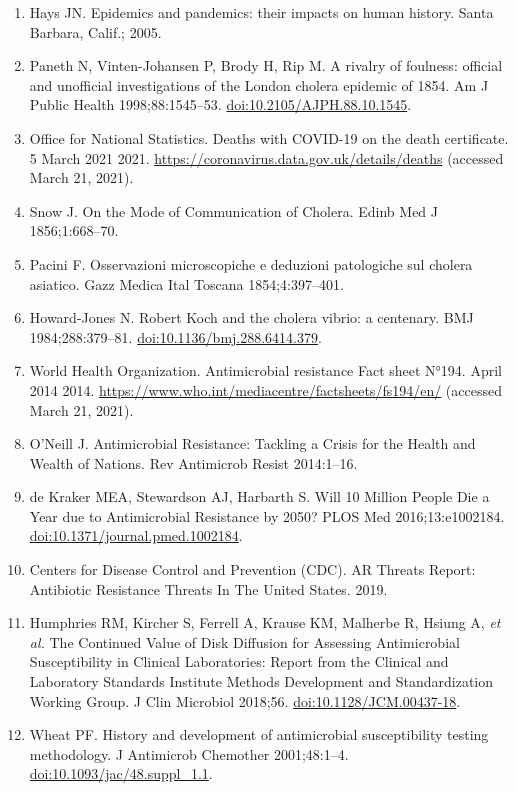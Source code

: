 \documentclass[
]{book}
\providecommand{\tightlist}{%
  \setlength{\itemsep}{0pt}\setlength{\parskip}{0pt}}
\begin{document}
\begin{enumerate}
\def\labelenumi{\arabic{enumi}.}
\tightlist
\item
  Hays JN. Epidemics and pandemics: their impacts on human history. Santa Barbara, Calif.; 2005.
\item
  Paneth N, Vinten-Johansen P, Brody H, Rip M. A rivalry of foulness: official and unofficial investigations of the London cholera epidemic of 1854. Am J Public Health 1998;88:1545--53. \url{doi:10.2105/AJPH.88.10.1545}.
\item
  Office for National Statistics. Deaths with COVID-19 on the death certificate. 5 March 2021 2021. \url{https://coronavirus.data.gov.uk/details/deaths} (accessed March 21, 2021).
\item
  Snow J. On the Mode of Communication of Cholera. Edinb Med J 1856;1:668--70.
\item
  Pacini F. Osservazioni microscopiche e deduzioni patologiche sul cholera asiatico. Gazz Medica Ital Toscana 1854;4:397--401.
\item
  Howard-Jones N. Robert Koch and the cholera vibrio: a centenary. BMJ 1984;288:379--81. \url{doi:10.1136/bmj.288.6414.379}.
\item
  World Health Organization. Antimicrobial resistance Fact sheet N°194. April 2014 2014. \url{https://www.who.int/mediacentre/factsheets/fs194/en/} (accessed March 21, 2021).
\item
  O'Neill J. Antimicrobial Resistance: Tackling a Crisis for the Health and Wealth of Nations. Rev Antimicrob Resist 2014:1--16.
\item
  de Kraker MEA, Stewardson AJ, Harbarth S. Will 10 Million People Die a Year due to Antimicrobial Resistance by 2050? PLOS Med 2016;13:e1002184. \url{doi:10.1371/journal.pmed.1002184}.
\item
  Centers for Disease Control and Prevention (CDC). AR Threats Report: Antibiotic Resistance Threats In The United States. 2019.
\item
  Humphries RM, Kircher S, Ferrell A, Krause KM, Malherbe R, Hsiung A, \emph{et al.} The Continued Value of Disk Diffusion for Assessing Antimicrobial Susceptibility in Clinical Laboratories: Report from the Clinical and Laboratory Standards Institute Methods Development and Standardization Working Group. J Clin Microbiol 2018;56. \url{doi:10.1128/JCM.00437-18}.
\item
  Wheat PF. History and development of antimicrobial susceptibility testing methodology. J Antimicrob Chemother 2001;48:1--4. \url{doi:10.1093/jac/48.suppl_1.1}.

\end{enumerate}
\end{document}
